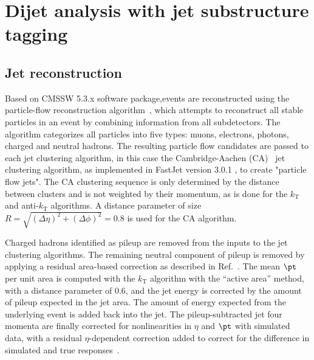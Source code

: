 \section{Dijet analysis with jet substructure tagging}
\label{sec:analysis}

\subsection{Jet reconstruction}

\label{sec:reconstruction}


Based on CMSSW 5.3.x software package,events are reconstructed using the particle-flow reconstruction
algorithm~\cite{particleflow}, which attempts to reconstruct all
stable particles in an event by combining information from all
subdetectors. The algorithm categorizes all particles into five types:
muons, electrons, photons, charged and neutral hadrons. The resulting
particle flow candidates are passed to each jet clustering algorithm, in this case the
Cambridge-Aachen (CA)~\cite{CAaachen,CAcambridge}
jet clustering algorithm, as implemented in FastJet version 3.0.1 \cite{fastjet1,fastjet},
to create "particle flow jets".
The CA clustering sequence is only determined by the distance between
clusters and is not weighted by their momentum, as is done for the
$k_\text{T}$ and anti-$k_\text{T}$ algorithms. A distance parameter of
size $R=\sqrt{(\Delta \eta)^2 + (\Delta\phi)^2}=0.8$ is used for the CA algorithm.


Charged hadrons identified as pileup are removed from the inputs to
the jet clustering algorithms.  The remaining neutral component of pileup
is removed by applying a residual area-based correction as
described in Ref.~\cite{jetarea_fastjet,jetarea_fastjet_pu}.  The mean
$\pt$ per unit area is computed with the $k_{\mathrm T}$ algorithm
with the ``active area'' method, with a distance parameter of 0.6, and
the jet energy is corrected by the amount of pileup expected in the
jet area. The amount of energy expected from the underlying event is
added back into the jet.  The pileup-subtracted jet four momenta are
finally corrected for nonlinearities in $\eta$ and $\pt$ with
simulated data, with a residual $\eta$-dependent correction added to
correct for the difference in simulated and true
responses~\cite{JME-JINST,Collaboration:2012dp}.

